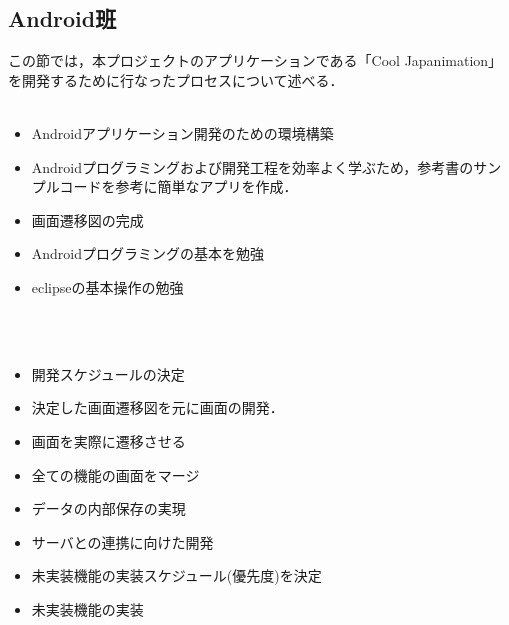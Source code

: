 \subsection{Android班}
\par この節では，本プロジェクトのアプリケーションである「Cool Japanimation」を開発するために行なったプロセスについて述べる．
\\
\\
\begin{itemize}
\item Androidアプリケーション開発のための環境構築
\item Androidプログラミングおよび開発工程を効率よく学ぶため，参考書のサンプルコードを参考に簡単なアプリを作成．
\item 画面遷移図の完成
\item Androidプログラミングの基本を勉強
\item eclipseの基本操作の勉強
\end{itemize}
\\
\\
\begin{itemize}
\item 開発スケジュールの決定
\item 決定した画面遷移図を元に画面の開発．
\item 画面を実際に遷移させる
\item 全ての機能の画面をマージ
\item データの内部保存の実現
\item サーバとの連携に向けた開発
\item 未実装機能の実装スケジュール(優先度)を決定
\item 未実装機能の実装
\end{itemize}
